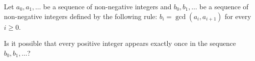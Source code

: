 Let $a_0, a_1, \dots$ be a sequence of non-negative integers and $b_0, b_1, \dots$ be a sequence of non-negative integers defined by the following rule: $b_i=\gcd(a_i, a_{i+1})$ for every $i\ge0$.

Is it possible that every positive integer appears exactly once in the sequence $b_0, b_1,\dots$?
